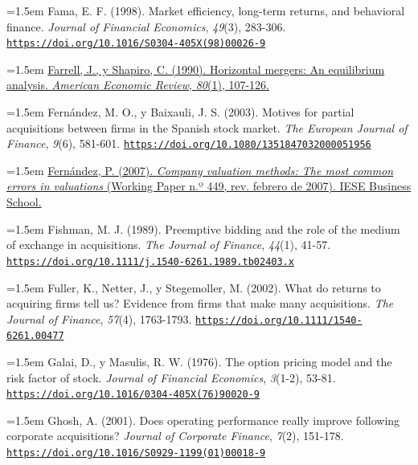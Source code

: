 \documentclass[10pt,a4paper]{article}
\begin{document}
\noindent\hangindent=1.5em Fama, E. F. (1998). Market efficiency, long-term returns, and behavioral finance. \textit{Journal of Financial Economics}, \textit{49}(3), 283-306. \href{https://doi.org/10.1016/S0304-405X(98)00026-9}{\nolinkurl{https://doi.org/10.1016/S0304-405X(98)00026-9}}

\noindent\hangindent=1.5em \href{https://ideas.repec.org/a/aea/aecrev/v80y1990i1p107-26.html}{Farrell, J., y Shapiro, C. (1990). Horizontal mergers: An equilibrium analysis. \textit{American Economic Review}, \textit{80}(1), 107-126.}

\noindent\hangindent=1.5em Fernández, M. O., y Baixauli, J. S. (2003). Motives for partial acquisitions between firms in the Spanish stock market. \textit{The European Journal of Finance}, \textit{9}(6), 581-601. \href{https://doi.org/10.1080/1351847032000051956}{\nolinkurl{https://doi.org/10.1080/1351847032000051956}}

\noindent\hangindent=1.5em \href{https://www.iese.edu/media/research/pdfs/DI-0449-E.pdf}{Fernández, P. (2007). \textit{Company valuation methods: The most common errors in valuations} (Working Paper n.º 449, rev. febrero de 2007). IESE Business School.}

\noindent\hangindent=1.5em Fishman, M. J. (1989). Preemptive bidding and the role of the medium of exchange in acquisitions. \textit{The Journal of Finance}, \textit{44}(1), 41-57. \href{https://doi.org/10.1111/j.1540-6261.1989.tb02403.x}{\nolinkurl{https://doi.org/10.1111/j.1540-6261.1989.tb02403.x}}

\noindent\hangindent=1.5em Fuller, K., Netter, J., y Stegemoller, M. (2002). What do returns to acquiring firms tell us? Evidence from firms that make many acquisitions. \textit{The Journal of Finance}, \textit{57}(4), 1763-1793. \href{https://doi.org/10.1111/1540-6261.00477}{\nolinkurl{https://doi.org/10.1111/1540-6261.00477}}

\noindent\hangindent=1.5em Galai, D., y Masulis, R. W. (1976). The option pricing model and the risk factor of stock. \textit{Journal of Financial Economics}, \textit{3}(1-2), 53-81. \href{https://doi.org/10.1016/0304-405X(76)90020-9}{\nolinkurl{https://doi.org/10.1016/0304-405X(76)90020-9}}

\noindent\hangindent=1.5em Ghosh, A. (2001). Does operating performance really improve following corporate acquisitions? \textit{Journal of Corporate Finance}, \textit{7}(2), 151-178. \href{https://doi.org/10.1016/S0929-1199(01)00018-9}{\nolinkurl{https://doi.org/10.1016/S0929-1199(01)00018-9}}
\end{document}
